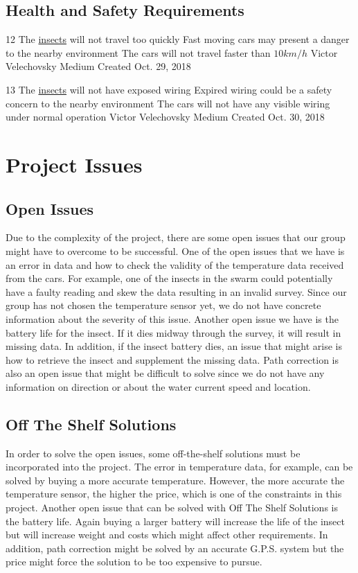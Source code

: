 \documentclass[11pt]{article}
\begin{document}
\subsection{Health and Safety Requirements}

\nonFunctionalRequirement
{12}
{The \hyperref[sec:definitions]{insects} will not travel too quickly}
{Fast moving cars may present a danger to the nearby environment}
{The cars will not travel faster than $10 km/h$}
{Victor Velechovsky}
{Medium}
{Created Oct. 29, 2018}

\nonFunctionalRequirement
{13}
{The \hyperref[sec:definitions]{insects} will not have exposed wiring}
{Expired wiring could be a safety concern to the nearby environment}
{The cars will not have any visible wiring under normal operation}
{Victor Velechovsky}
{Medium}
{Created Oct. 30, 2018}

\section{Project Issues}
\subsection{Open Issues}
Due to the complexity of the project, there are some open issues that our group might have to overcome to be successful. One of the open issues that we have is an error in data and how to check the validity of the temperature data received from the cars. For example, one of the insects in the swarm could potentially have a faulty reading and skew the data resulting in an invalid survey. Since our group has not chosen the temperature sensor yet, we do not have concrete information about the severity of this issue. Another open issue we have is the battery life for the insect. If it dies midway through the survey, it will result in missing data. In addition, if the insect battery dies, an issue that might arise is how to retrieve the insect and supplement the missing data. Path correction is also an open issue that might be difficult to solve since we do not have any information on direction or about the water current speed and location. 
\subsection{Off The Shelf Solutions}
In order to solve the open issues, some off-the-shelf solutions must be incorporated into the project. The error in temperature data, for example, can be solved by buying a more accurate temperature. However, the more accurate the temperature sensor, the higher the price, which is one of the constraints in this project. Another open issue that can be solved with Off The Shelf Solutions is the battery life. Again buying a larger battery will increase the life of the insect but will increase weight and costs which might affect other requirements. In addition, path correction might be solved by an accurate G.P.S. system but the price might force the solution to be too expensive to pursue. 
\end{document}
